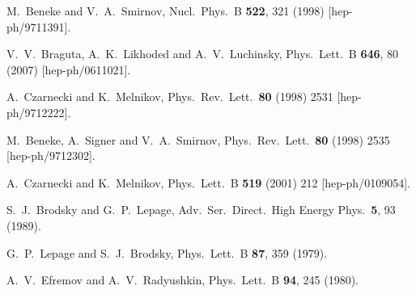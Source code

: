 \documentclass[english,preprint,aps,prd,showpacs,superscriptaddress,nofootinbib,tightenlines]{revtex4}
\begin{document}
\begin{thebibliography}{99}
  M.~Beneke and V.~A.~Smirnov,
  Nucl.\ Phys.\ B {\bf 522}, 321 (1998)  [hep-ph/9711391].

  V.~V.~Braguta, A.~K.~Likhoded and A.~V.~Luchinsky,
  Phys.\ Lett.\ B {\bf 646}, 80 (2007)
  [hep-ph/0611021].


  A.~Czarnecki and K.~Melnikov,
  Phys.\ Rev.\ Lett.\  {\bf 80} (1998) 2531
  [hep-ph/9712222].


  M.~Beneke, A.~Signer and V.~A.~Smirnov,
  Phys.\ Rev.\ Lett.\  {\bf 80} (1998) 2535
  [hep-ph/9712302].


  A.~Czarnecki and K.~Melnikov,
  Phys.\ Lett.\ B {\bf 519} (2001) 212
  [hep-ph/0109054].

  S.~J.~Brodsky and G.~P.~Lepage,
  Adv.\ Ser.\ Direct.\ High Energy Phys.\  {\bf 5}, 93 (1989).

  G.~P.~Lepage and S.~J.~Brodsky,
  Phys.\ Lett.\ B {\bf 87}, 359 (1979).

  A.~V.~Efremov and A.~V.~Radyushkin,
  Phys.\ Lett.\ B {\bf 94}, 245 (1980).


\end{thebibliography}
\end{document}
